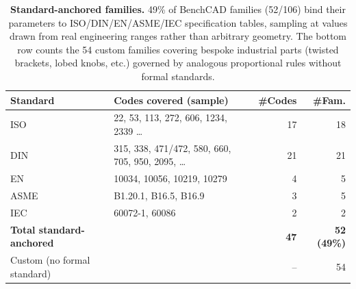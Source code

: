 \begin{table}[t]
\centering
\small
\caption{\textbf{Standard-anchored families.} 49\% of BenchCAD families (52/106) bind their parameters to ISO/DIN/EN/ASME/IEC specification tables, sampling at values drawn from real engineering ranges rather than arbitrary geometry. The bottom row counts the 54 custom families covering bespoke industrial parts (twisted brackets, lobed knobs, etc.) governed by analogous proportional rules without formal standards.}
\label{tab:standards}
\begin{tabular}{llrr}
\toprule
Standard & Codes covered (sample) & \#Codes & \#Fam. \\
\midrule
ISO   & 22, 53, 113, 272, 606, 1234, 2339 \ldots & 17 & 18 \\
DIN   & 315, 338, 471/472, 580, 660, 705, 950, 2095, \ldots & 21 & 21 \\
EN    & 10034, 10056, 10219, 10279                       & 4 & 5 \\
ASME  & B1.20.1, B16.5, B16.9                            & 3 & 5 \\
IEC   & 60072-1, 60086                                   & 2 & 2 \\
\midrule
\textbf{Total standard-anchored}   & & \textbf{47} & \textbf{52 (49\%)} \\
Custom (no formal standard)        & & --          & 54 \\
\bottomrule
\end{tabular}
\end{table}

